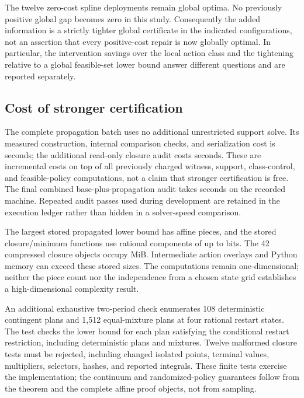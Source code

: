The twelve zero-cost spline deployments remain global optima. No previously positive global gap becomes zero in this study. Consequently the added information is a strictly tighter global certificate in the indicated configurations, not an assertion that every positive-cost repair is now globally optimal. In particular, the intervention savings over the local action class and the tightening relative to a global feasible-set lower bound answer different questions and are reported separately.

\subsection{Cost of stronger certification}
The complete propagation batch uses no additional unrestricted support solve. Its measured construction, internal comparison checks, and serialization cost is \RestartConstructionSeconds{} seconds; the additional read-only closure audit costs \RestartAuditSeconds{} seconds. These are incremental costs on top of all previously charged witness, support, class-control, and feasible-policy computations, not a claim that stronger certification is free. The final combined base-plus-propagation audit takes \RestartFullAuditSeconds{} seconds on the recorded machine. Repeated audit passes used during development are retained in the execution ledger rather than hidden in a solver-speed comparison.

The largest stored propagated lower bound has \RestartMaxPieces{} affine pieces, and the stored closure/minimum functions use rational components of up to \RestartMaxBits{} bits. The 42 compressed closure objects occupy \RestartCompressedMiB{} MiB. Intermediate action overlays and Python memory can exceed these stored sizes. The computations remain one-dimensional; neither the piece count nor the independence from a chosen state grid establishes a high-dimensional complexity result.

An additional exhaustive two-period check enumerates 108 deterministic contingent plans and 1,512 equal-mixture plans at four rational restart states. The test checks the lower bound for each plan satisfying the conditional restart restriction, including \RestartTreeFeasible{} deterministic plans and \RestartMixtureFeasible{} mixtures. Twelve malformed closure tests must be rejected, including changed isolated points, terminal values, multipliers, selectors, hashes, and reported integrals. These finite tests exercise the implementation; the continuum and randomized-policy guarantees follow from the theorem and the complete affine proof objects, not from sampling.


